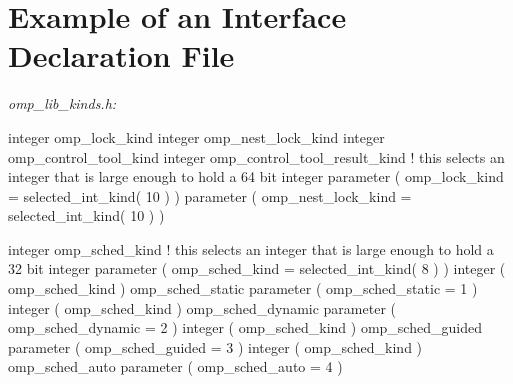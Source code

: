 {\section{Example of an Interface Declaration  File}}
\label{sec:Example of an Interface Declaration include File}
\emph{omp\_lib\_kinds.h:}
{\small \begin{ompfSyntax}

     integer omp_lock_kind
     integer omp_nest_lock_kind
     integer omp_control_tool_kind
     integer omp_control_tool_result_kind
! this selects an integer that is large enough to hold a 64 bit integer
     parameter ( omp_lock_kind = selected_int_kind( 10 ) )
     parameter ( omp_nest_lock_kind = selected_int_kind( 10 ) )

     integer omp_sched_kind
! this selects an integer that is large enough to hold a 32 bit integer
     parameter ( omp_sched_kind = selected_int_kind( 8 ) )
     integer ( omp_sched_kind ) omp_sched_static
     parameter ( omp_sched_static = 1 )
     integer ( omp_sched_kind ) omp_sched_dynamic
     parameter ( omp_sched_dynamic = 2 )
     integer ( omp_sched_kind ) omp_sched_guided
     parameter ( omp_sched_guided = 3 )
     integer ( omp_sched_kind ) omp_sched_auto
     parameter ( omp_sched_auto = 4 )


\end{ompfSyntax}}
